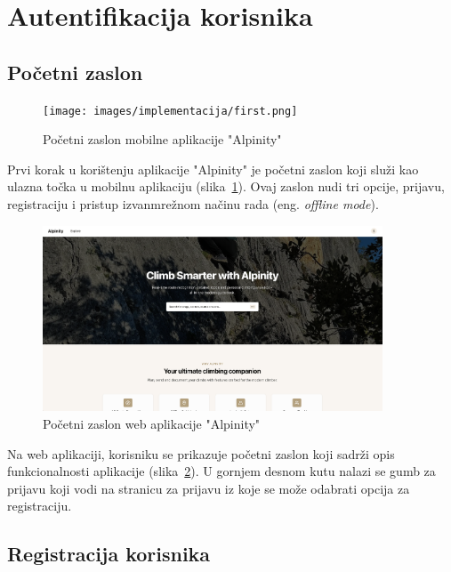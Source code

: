 \section{Autentifikacija korisnika}

\subsection{Početni zaslon}

\begin{figure}[H]
  \centering
  \texttt{[image: images/implementacija/first.png]}
  \caption{Početni zaslon mobilne aplikacije "Alpinity"}
  \label{fig:prvi_zaslon}
\end{figure}

Prvi korak u korištenju aplikacije "Alpinity" je početni zaslon koji služi kao ulazna točka u mobilnu aplikaciju (slika~\ref{fig:prvi_zaslon}). Ovaj zaslon nudi tri opcije, prijavu, registraciju i pristup izvanmrežnom načinu rada (eng. \textit{offline mode}).

\begin{figure}[H]
  \centering
  \includegraphics[width=0.9\textwidth]{images/implementacija/web/pocetni_zaslon.png}
  \caption{Početni zaslon web aplikacije "Alpinity"}
  \label{fig:prvi_zaslon_web}
\end{figure}

Na web aplikaciji, korisniku se prikazuje početni zaslon koji sadrži opis funkcionalnosti aplikacije (slika~\ref{fig:prvi_zaslon_web}). U gornjem desnom kutu nalazi se gumb za prijavu koji vodi na stranicu za prijavu iz koje se može odabrati opcija za registraciju.

\subsection{Registracija korisnika}

